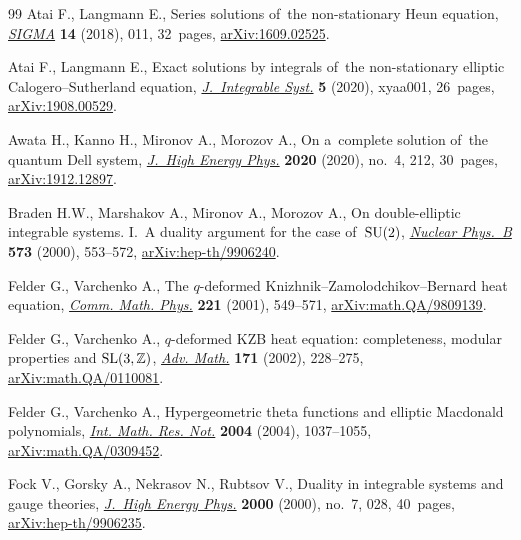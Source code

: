 \documentclass[pdftex]{sigma}%
\numberwithin{equation}{section}
\begin{document}
\begin{thebibliography}{99}
\footnotesize\itemsep=0pt
Atai F., Langmann E., Series solutions of~the non-stationary {H}eun equation,
 \href{https://doi.org/10.3842/SIGMA.2018.011}{\textit{SIGMA}} \textbf{14} (2018), 011, 32~pages, \href{https://arxiv.org/abs/1609.02525}{arXiv:1609.02525}.

Atai F., Langmann E., Exact solutions by integrals of~the non-stationary
 elliptic {C}alogero--{S}utherland equation, \href{https://doi.org/10.1093/integr/xyaa001}{\textit{J.~Integrable Syst.}}
 \textbf{5} (2020), xyaa001, 26~pages, \href{https://arxiv.org/abs/1908.00529}{arXiv:1908.00529}.

Awata H., Kanno H., Mironov A., Morozov A., On a~complete solution of~the
 quantum {D}ell system, \href{https://doi.org/10.1007/jhep04(2020)212}{\textit{J.~High Energy Phys.}} \textbf{2020} (2020),
 no.~4, 212, 30~pages, \href{https://arxiv.org/abs/1912.12897}{arXiv:1912.12897}.

Braden H.W., Marshakov A., Mironov A., Morozov A., On double-elliptic
 integrable systems. {I}.~{A} duality argument for the case of~{${\rm
 SU}(2)$}, \href{https://doi.org/10.1016/S0550-3213(99)00739-7}{\textit{Nuclear Phys.~B}} \textbf{573} (2000), 553--572,
 \href{https://arxiv.org/abs/hep-th/9906240}{arXiv:hep-th/9906240}.

Felder G., Varchenko A., The {$q$}-deformed
 {K}nizhnik--{Z}amolodchikov--{B}ernard heat equation, \href{https://doi.org/10.1007/s002200100487}{\textit{Comm. Math.
 Phys.}} \textbf{221} (2001), 549--571, \href{https://arxiv.org/abs/math.QA/9809139}{arXiv:math.QA/9809139}.

Felder G., Varchenko A., {$q$}-deformed {KZB} heat equation: completeness,
 modular properties and {${\rm SL}(3,{\mathbb Z})$}, \href{https://doi.org/10.1006/aima.2002.2080}{\textit{Adv. Math.}}
 \textbf{171} (2002), 228--275, \href{https://arxiv.org/abs/math.QA/0110081}{arXiv:math.QA/0110081}.

Felder G., Varchenko A., Hypergeometric theta functions and elliptic
 {M}acdonald polynomials, \href{https://doi.org/10.1155/S1073792804132893}{\textit{Int. Math. Res. Not.}} \textbf{2004} (2004),
 1037--1055, \href{https://arxiv.org/abs/math.QA/0309452}{arXiv:math.QA/0309452}.

Fock V., Gorsky A., Nekrasov N., Rubtsov V., Duality in integrable systems and
 gauge theories, \href{https://doi.org/10.1088/1126-6708/2000/07/028}{\textit{J.~High Energy Phys.}} \textbf{2000} (2000), no.~7,
 028, 40~pages, \href{https://arxiv.org/abs/hep-th/9906235}{arXiv:hep-th/9906235}.


\end{thebibliography}
\end{document}
